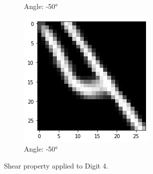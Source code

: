 \begin{figure}[!htbp]
\begin{subfigure}[b]{.3\textwidth}
            \caption{Angle: \ang{-50}}
            \label{fig:Rotate-misclass0}
        \end{subfigure}%
        \begin{subfigure}[b]{.3\textwidth}
            \includegraphics[width=\linewidth]{images/shear3.png}
            \caption{Angle: \ang{-50}}
            \label{fig:Rotate-misclass0}
        \end{subfigure}
        
        \caption{Shear property applied to Digit 4.}
        \label{fig:Shear-property}
    \end{figure}
    \FloatBarrier
    
